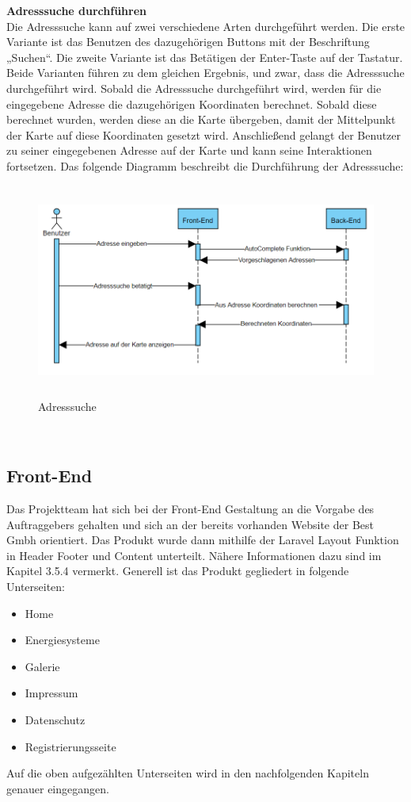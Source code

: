 \newpage
\textbf{Adresssuche durchführen} \\
Die Adresssuche kann auf zwei verschiedene Arten durchgeführt werden.
Die erste Variante ist das Benutzen des dazugehörigen Buttons mit der Beschriftung „Suchen“. Die zweite Variante ist das Betätigen der Enter-Taste auf der Tastatur. Beide Varianten führen zu dem gleichen Ergebnis, und zwar, dass die Adresssuche durchgeführt wird.
Sobald die Adresssuche durchgeführt wird, werden für die eingegebene Adresse die dazugehörigen Koordinaten berechnet. Sobald diese berechnet wurden, werden diese an die Karte übergeben, damit der Mittelpunkt der Karte auf diese Koordinaten gesetzt wird. Anschließend gelangt der Benutzer zu seiner eingegebenen Adresse auf der Karte und kann seine Interaktionen fortsetzen. Das folgende Diagramm beschreibt die Durchführung der Adresssuche:
\begin{figure}[h]
	\centering
	\includegraphics[height=7cm,width=14cm]{images/Adresssuche}
	\caption{Adresssuche}
	\label{fig:Adresssuche }
\end{figure}
\\

\newpage
\subsection{Front-End} \label{sec: Front-End}
Das Projektteam hat sich bei der Front-End Gestaltung an die Vorgabe des Auftraggebers gehalten und sich an der bereits vorhanden Website der Best Gmbh orientiert. Das Produkt wurde dann mithilfe der Laravel Layout Funktion in Header Footer und Content unterteilt. Nähere Informationen dazu sind im Kapitel 3.5.4 vermerkt. Generell ist das Produkt gegliedert in folgende Unterseiten: 
\begin{itemize}
	\item Home 
	\item Energiesysteme
	\item Galerie 
	\item Impressum 
	\item Datenschutz
	\item Registrierungsseite
\end{itemize}
Auf die oben aufgezählten Unterseiten wird in den nachfolgenden Kapiteln genauer eingegangen.


